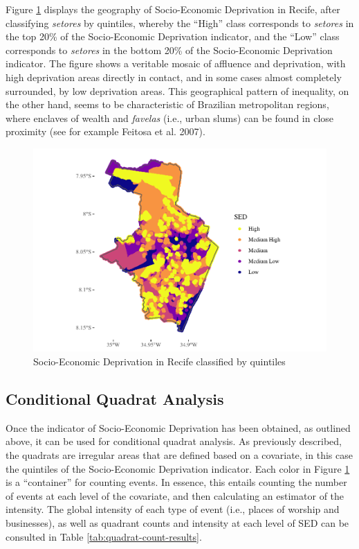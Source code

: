 \documentclass[smallextended]{svjour3}       %
\begin{document}
Figure \ref{fig:plot-sed-as-quintiles} displays the geography of
Socio-Economic Deprivation in Recife, after classifying \emph{setores}
by quintiles, whereby the ``High'' class corresponds to \emph{setores}
in the top 20\% of the Socio-Economic Deprivation indicator, and the
``Low'' class corresponds to \emph{setores} in the bottom 20\% of the
Socio-Economic Deprivation indicator. The figure shows a veritable
mosaic of affluence and deprivation, with high deprivation areas
directly in contact, and in some cases almost completely surrounded, by
low deprivation areas. This geographical pattern of inequality, on the
other hand, seems to be characteristic of Brazilian metropolitan
regions, where enclaves of wealth and \emph{favelas} (i.e., urban slums)
can be found in close proximity (see for example Feitosa et al. 2007).

\begin{figure}
\centering
\includegraphics{Moral_Communities_and_Crime_files/figure-latex/plot-sed-as-quintiles-1.pdf}
\caption{\label{fig:plot-sed-as-quintiles}Socio-Economic Deprivation in
Recife classified by quintiles}
\end{figure}

\hypertarget{conditional-quadrat-analysis}{%
\subsection{Conditional Quadrat
Analysis}\label{conditional-quadrat-analysis}}

Once the indicator of Socio-Economic Deprivation has been obtained, as
outlined above, it can be used for conditional quadrat analysis. As
previously described, the quadrats are irregular areas that are defined
based on a covariate, in this case the quintiles of the Socio-Economic
Deprivation indicator. Each color in Figure
\ref{fig:plot-sed-as-quintiles} is a ``container'' for counting events.
In essence, this entails counting the number of events at each level of
the covariate, and then calculating an estimator of the intensity. The
global intensity of each type of event (i.e., places of worship and
businesses), as well as quadrant counts and intensity at each level of
SED can be consulted in Table \ref{tab:quadrat-count-results}.
\end{document}
